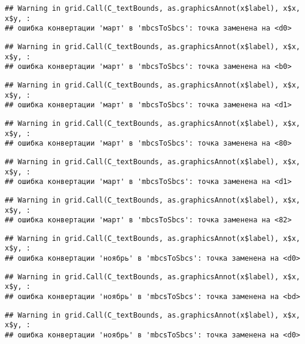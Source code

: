 \documentclass[
]{article}
\begin{document}
\begin{verbatim}
## Warning in grid.Call(C_textBounds, as.graphicsAnnot(x$label), x$x, x$y, :
## ошибка конвертации 'март' в 'mbcsToSbcs': точка заменена на <d0>
\end{verbatim}

\begin{verbatim}
## Warning in grid.Call(C_textBounds, as.graphicsAnnot(x$label), x$x, x$y, :
## ошибка конвертации 'март' в 'mbcsToSbcs': точка заменена на <b0>
\end{verbatim}

\begin{verbatim}
## Warning in grid.Call(C_textBounds, as.graphicsAnnot(x$label), x$x, x$y, :
## ошибка конвертации 'март' в 'mbcsToSbcs': точка заменена на <d1>
\end{verbatim}

\begin{verbatim}
## Warning in grid.Call(C_textBounds, as.graphicsAnnot(x$label), x$x, x$y, :
## ошибка конвертации 'март' в 'mbcsToSbcs': точка заменена на <80>
\end{verbatim}

\begin{verbatim}
## Warning in grid.Call(C_textBounds, as.graphicsAnnot(x$label), x$x, x$y, :
## ошибка конвертации 'март' в 'mbcsToSbcs': точка заменена на <d1>
\end{verbatim}

\begin{verbatim}
## Warning in grid.Call(C_textBounds, as.graphicsAnnot(x$label), x$x, x$y, :
## ошибка конвертации 'март' в 'mbcsToSbcs': точка заменена на <82>
\end{verbatim}

\begin{verbatim}
## Warning in grid.Call(C_textBounds, as.graphicsAnnot(x$label), x$x, x$y, :
## ошибка конвертации 'ноябрь' в 'mbcsToSbcs': точка заменена на <d0>
\end{verbatim}

\begin{verbatim}
## Warning in grid.Call(C_textBounds, as.graphicsAnnot(x$label), x$x, x$y, :
## ошибка конвертации 'ноябрь' в 'mbcsToSbcs': точка заменена на <bd>
\end{verbatim}

\begin{verbatim}
## Warning in grid.Call(C_textBounds, as.graphicsAnnot(x$label), x$x, x$y, :
## ошибка конвертации 'ноябрь' в 'mbcsToSbcs': точка заменена на <d0>
\end{verbatim}
\end{document}

